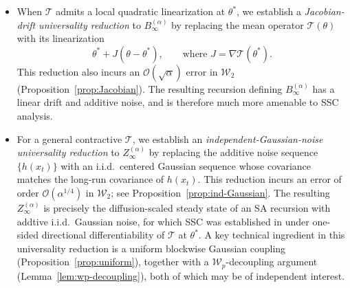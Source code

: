 \documentclass[11pt,letterpaper]{article}
\theoremstyle{plain}
\theoremstyle{definition}
\theoremstyle{remark}
\newcommand{\mT}{\mathcal{T}}
\newcommand{\W}{\mathcal{W}}
\begin{document}
\begin{itemize}
    \item 
    When $\mT$ admits a local quadratic linearization at $\theta^*$, we establish a
    \emph{Jacobian-drift universality reduction} to
    $B_\infty^{(\alpha)}$ by replacing the mean operator $\mT(\theta)$ with
    its linearization 
    \[
        \theta^* + J(\theta-\theta^*),
        \qquad\mbox{where }
        J=\nabla \mT(\theta^*).
    \]
    This reduction also incurs an $\mathcal O(\sqrt{\alpha})$ error in $\W_2$
    (Proposition~\ref{prop:Jacobian}). The resulting recursion defining
    $B_\infty^{(\alpha)}$ has a linear drift and additive noise, and is
    therefore much more amenable to SSC analysis.

    \item For a general contractive  \(\mT\), we establish an
\emph{independent-Gaussian-noise universality reduction} to
\(Z_\infty^{(\alpha)}\) by replacing the additive noise sequence
\(\{h(x_t)\}\) with an i.i.d.\ centered Gaussian sequence whose covariance
matches the long-run covariance of \(h(x_t)\). This reduction incurs an error
of order \(\mathcal O(\alpha^{1/4})\) in \(\W_2\);
see Proposition~\ref{prop:ind-Gaussian}. The resulting
\(Z_\infty^{(\alpha)}\) is precisely the diffusion-scaled steady state of an
SA recursion with addtive i.i.d.\ Gaussian noise, for which SSC was established in
\cite{zhang2024prelimit} under one-sided directional differentiability of
\(\mT\) at \(\theta^*\). A key technical ingredient in this universality reduction is a uniform
blockwise Gaussian coupling (Proposition~\ref{prop:uniform}), together with a
\(\W_p\)-decoupling argument (Lemma~\ref{lem:wp-decoupling}), both of which
may be of independent interest.
\end{itemize}
\end{document}
